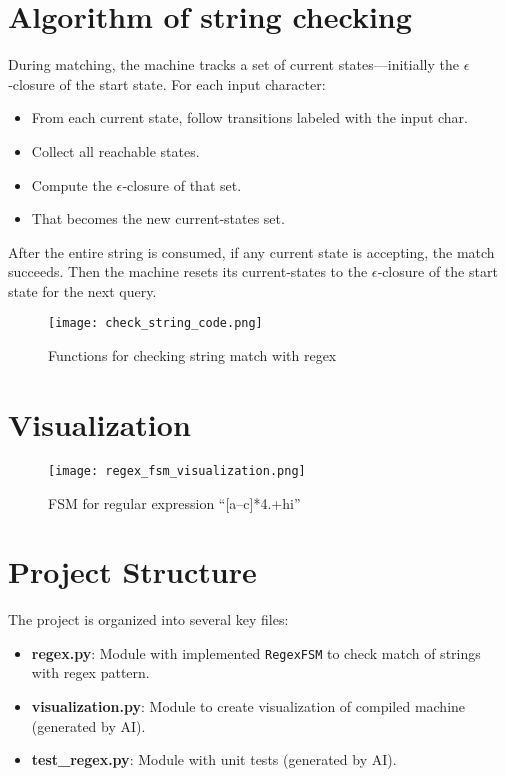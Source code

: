 \documentclass{article}
\begin{document}
\section{Algorithm of string checking}
During matching, the machine tracks a set of current states—initially the $\epsilon$‑closure of the start state. For each input character:
\begin{itemize}
  \item From each current state, follow transitions labeled with the input char.
  \item Collect all reachable states.
  \item Compute the $\epsilon$‑closure of that set.
  \item That becomes the new current‑states set.
\end{itemize}
After the entire string is consumed, if any current state is accepting, the match succeeds. Then the machine resets its current‑states to the $\epsilon$‑closure of the start state for the next query.

\begin{figure}[htbp]
  \centering
  \texttt{[image: check\_string\_code.png]}
  \caption{Functions for checking string match with regex}
  \label{fig:check_string}
\end{figure}
\FloatBarrier

\section{Visualization}
\begin{figure}[H]
  \centering
  \texttt{[image: regex\_fsm\_visualization.png]}
  \caption{FSM for regular expression “[a–c]*4.+hi”}
  \label{fig:visualization}
\end{figure}
\FloatBarrier

\section{Project Structure}
The project is organized into several key files:
\begin{itemize}
    \item \textbf{regex.py}: Module with implemented \texttt{RegexFSM} to check match of strings with regex pattern.
    \item \textbf{visualization.py}: Module to create visualization of compiled machine (generated by AI).
    \item \textbf{test\_regex.py}: Module with unit tests (generated by AI).
\end{itemize}
\end{document}
